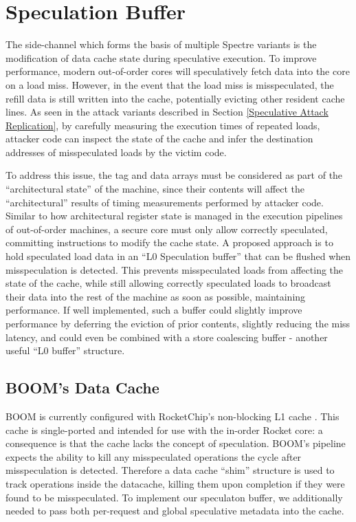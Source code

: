 \section{Speculation Buffer} \label{Speculation Buffer}

The side-channel which forms the basis of multiple Spectre variants is the modification of data cache state during speculative execution.
To improve performance, modern out-of-order cores will speculatively fetch data into the core on a load miss.
However, in the event that the load miss is misspeculated, the refill data is still written into the cache, potentially evicting other resident cache lines.
As seen in the attack variants described in Section \ref{Speculative Attack Replication}, by carefully measuring the execution times of repeated loads, attacker code can inspect the state of the cache and infer the destination addresses of misspeculated loads by the victim code.

To address this issue, the tag and data arrays must be considered as part of the ``architectural state'' of the machine, since their contents will affect the ``architectural'' results of timing measurements performed by attacker code.
Similar to how architectural register state is managed in the execution pipelines of out-of-order machines, a secure core must only allow correctly speculated, committing instructions to modify the cache state.
A proposed approach is to hold speculated load data in an ``L0 Speculation buffer'' that can be flushed when misspeculation is detected.
This prevents misspeculated loads from affecting the state of the cache, while still allowing correctly speculated loads to broadcast their data into the rest of the machine as soon as possible, maintaining performance. If well implemented, such a buffer could slightly improve performance by deferring the eviction of prior contents, slightly reducing the miss latency, and could even be combined with a store coalescing buffer - another useful ``L0 buffer'' structure.

\subsection{BOOM's Data Cache}
BOOM is currently configured with RocketChip's non-blocking L1 cache \cite{b54}. This cache is single-ported and intended for use with the in-order Rocket core: a consequence is that the cache lacks the concept of speculation. BOOM's pipeline expects the ability to kill any misspeculated operations the cycle after misspeculation is detected. Therefore a data cache ``shim'' structure is used to track operations inside the datacache, killing them upon completion if they were found to be misspeculated. To implement our speculaton buffer, we additionally needed to pass both per-request and global speculative metadata into the cache.

